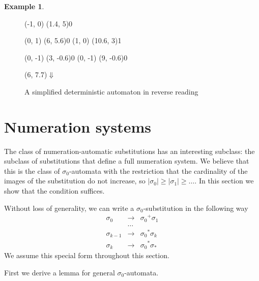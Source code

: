 \documentclass{article}
\theoremstyle{definition}
\newtheorem{example}[theorem]{Example}
\begin{document}
\begin{example}
\begin{itemize}
\begin{figure}[H]
\begin{graph}
   
   

  (-1, 0) \freetext(1.4, 5){0}
   
   
   

   
   
  (0, 1) \freetext(6, 5.6){0}
   
   
  (1, 0) \freetext(10.6, 3){1}

  
  (0, -1) \freetext(3, -0.6){0}
   
  (0, -1) \freetext(9, -0.6){0}
   

  \freetext(6, 7.7){$\Downarrow$}
\end{graph}
\caption{A simplified deterministic automaton in reverse reading}
\label{fig:simpl_det_reverse}
\end{figure}
\end{itemize}
\end{example}

\section{Numeration systems}
The class of numeration-automatic substitutions has an interesting subclass:
the subclass of substitutions that define a full numeration system. We 
believe that this is the class of $\sigma_0$-automata with the restriction
that the cardinality of the images of the substitution do not increase,
so $|\sigma_0| \ge |\sigma_1| \ge \ldots$. In this section we show that the
condition suffices.

Without loss of generality, we can write a $\sigma_0$-substitution in the
following way
\begin{eqnarray*}
\sigma_0       &\rightarrow& {\sigma_0}^+ \sigma_1\\
               &\ldots&\\
\sigma_{k - 1} &\rightarrow& {\sigma_0}^* \sigma_k\\
\sigma_k       &\rightarrow& {\sigma_0}^* \sigma_*
\end{eqnarray*}
We assume this special form throughout this section.

First we derive a lemma for general $\sigma_0$-automata.
\end{document}
